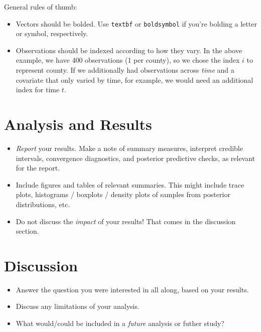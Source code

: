 \documentclass[11pt]{article}
\begin{document}
\noindent General rules of thumb:
\begin{itemize}
    \item Vectors should be bolded. Use \texttt{textbf} or \texttt{boldsymbol} if you're bolding a letter or symbol, respectively.
    \item Observations should be indexed according to how they vary. In the above example, we have 400 observations (1 per county), so we chose the index $i$ to represent county. If we additionally had observations across \textit{time} and a covariate that only varied by time, for example, we would need an additional index for time $t$.
\end{itemize}

\section*{Analysis and Results}

\begin{itemize}
    \item \textit{Report} your results. Make a note of summary measures, interpret credible intervals, convergence diagnostics, and posterior predictive checks, as relevant for the report.
    \item Include figures and tables of relevant summaries. This might include trace plots, histograms / boxplots / density plots of samples from posterior distributions, etc.
    \item Do not discuss the \textit{impact} of your results! That comes in the discussion section.
\end{itemize}

\section*{Discussion}

\begin{itemize}
    \item Answer the question you were interested in all along, based on your results.
    \item Discuss any limitations of your analysis.
    \item What would/could be included in a \textit{future} analysis or futher study?
\end{itemize}


\end{document}
